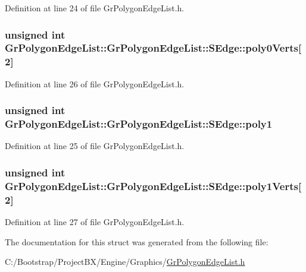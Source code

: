Definition at line 24 of file GrPolygonEdgeList.h.\hypertarget{struct_gr_polygon_edge_list_1_1_s_edge_db1ce702fd6d6c66282043d7003a49f6}{
\subsubsection[{poly0Verts}]{\setlength{\rightskip}{0pt plus 5cm}unsigned int GrPolygonEdgeList::GrPolygonEdgeList::SEdge::poly0Verts\mbox{[}2\mbox{]}}}
\label{struct_gr_polygon_edge_list_1_1_s_edge_db1ce702fd6d6c66282043d7003a49f6}




Definition at line 26 of file GrPolygonEdgeList.h.\hypertarget{struct_gr_polygon_edge_list_1_1_s_edge_fe945b7808586a1f3eab3fd0cd6b4ffd}{
\subsubsection[{poly1}]{\setlength{\rightskip}{0pt plus 5cm}unsigned int GrPolygonEdgeList::GrPolygonEdgeList::SEdge::poly1}}
\label{struct_gr_polygon_edge_list_1_1_s_edge_fe945b7808586a1f3eab3fd0cd6b4ffd}




Definition at line 25 of file GrPolygonEdgeList.h.\hypertarget{struct_gr_polygon_edge_list_1_1_s_edge_11cd6790cd93d269c06243ff5e40bf86}{
\subsubsection[{poly1Verts}]{\setlength{\rightskip}{0pt plus 5cm}unsigned int GrPolygonEdgeList::GrPolygonEdgeList::SEdge::poly1Verts\mbox{[}2\mbox{]}}}
\label{struct_gr_polygon_edge_list_1_1_s_edge_11cd6790cd93d269c06243ff5e40bf86}




Definition at line 27 of file GrPolygonEdgeList.h.

The documentation for this struct was generated from the following file:\begin{CompactItemize}
\item 
C:/Bootstrap/ProjectBX/Engine/Graphics/\hyperlink{_gr_polygon_edge_list_8h}{GrPolygonEdgeList.h}\end{CompactItemize}

